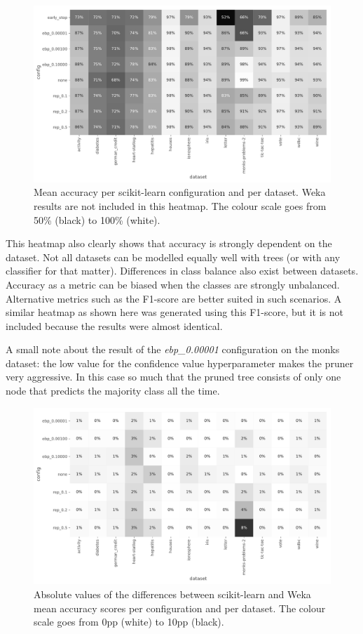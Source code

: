 \begin{figure}[htp]
    \includegraphics[width=\textwidth]{img/heatmap_accuracy.pdf}
    \caption{Mean accuracy per scikit-learn configuration and per dataset. Weka results are not included in this heatmap. The colour scale goes from 50\% (black) to 100\% (white).}%
    \label{fig:heat_acc}
\end{figure}

This heatmap also clearly shows that accuracy is strongly dependent on the dataset. Not all datasets can be modelled equally well with trees (or with any classifier for that matter). Differences in class balance also exist between datasets. Accuracy as a metric can be biased when the classes are strongly unbalanced. Alternative metrics such as the F1-score are better suited in such scenarios. A similar heatmap as shown here was generated using this F1-score, but it is not included because the results were almost identical.

A small note about the result of the \emph{ebp\_0.00001} configuration on the monks dataset: the low value for the confidence value hyperparameter makes the pruner very aggressive. In this case so much that the pruned tree consists of only one node that predicts the majority class all the time.

\begin{figure}[htp]
    \includegraphics[width=\textwidth]{img/heatmap_accuracy_diff.pdf}
    \caption{Absolute values of the differences between scikit-learn and Weka mean accuracy scores per configuration and per dataset. The colour scale goes from 0pp (white) to 10pp (black).}%
    \label{fig:heat_acc_diff}
\end{figure}

